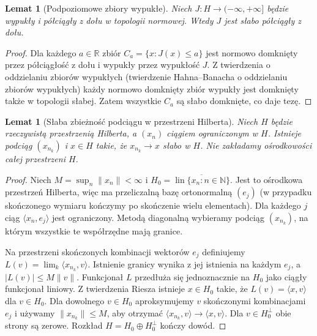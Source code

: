 \documentclass[11pt,a4paper]{article}
\numberwithin{equation}{section}
\theoremstyle{plain}
\newtheorem{lemat}[twierdzenie]{Lemat}
\theoremstyle{definition}
\theoremstyle{remark}
\newcommand{\R}{\mathbb R}
\newcommand{\N}{\mathbb N}
\begin{document}
\begin{lemat}[Podpoziomowe zbiory wypukłe]
\label{lem:convex-weaklsc16}
Niech $J:H\to(-\infty,+\infty]$ będzie wypukły
i półciągły z dołu w topologii normowej.
Wtedy $J$ jest słabo półciągły z dołu.
\end{lemat}
\begin{proof}
Dla każdego $a\in\R$ zbiór $C_a=\{x:J(x)\le a\}$
jest normowo domknięty przez półciągłość z dołu
i wypukły przez wypukłość $J$. Z twierdzenia
o oddzielaniu zbiorów wypukłych (twierdzenie Hahna--Banacha o oddzielaniu zbiorów wypukłych)
każdy normowo domknięty zbiór wypukły jest domknięty
także w topologii słabej. Zatem wszystkie $C_a$
są słabo domknięte, co daje tezę.
\end{proof}

\begin{lemat}[Słaba zbieżność podciągu w przestrzeni Hilberta]
\label{lem:hilbert-weakseq16}
Niech $H$ będzie rzeczywistą przestrzenią Hilberta,
a $(x_n)$ ciągiem ograniczonym w $H$.
Istnieje podciąg $(x_{n_k})$ i $x\in H$ takie,
że $x_{n_k}\to x$ słabo w $H$.
Nie zakładamy ośrodkowości całej przestrzeni $H$.
\end{lemat}
\begin{proof}
Niech $M=\sup_n\|x_n\|<\infty$ i
$H_0=\overline{\operatorname{lin}\{x_n:n\in\N\}}$.
Jest to ośrodkowa przestrzeń Hilberta, więc ma
przeliczalną bazę ortonormalną $(e_j)$
(w przypadku skończonego wymiaru kończymy po skończenie wielu elementach).
Dla każdego $j$ ciąg $\langle x_n,e_j\rangle$ jest ograniczony.
Metodą diagonalną wybieramy podciąg $(x_{n_k})$,
na którym wszystkie te współrzędne mają granice.

Na przestrzeni skończonych kombinacji wektorów $e_j$
definiujemy $L(v)=\lim_k\langle x_{n_k},v\rangle$.
Istnienie granicy wynika z jej istnienia na każdym $e_j$,
a $|L(v)|\le M\|v\|$. Funkcjonał $L$ przedłuża się
jednoznacznie na $H_0$ jako ciągły funkcjonał liniowy.
Z twierdzenia Riesza istnieje $x\in H_0$ takie,
że $L(v)=\langle x,v\rangle$ dla $v\in H_0$.
Dla dowolnego $v\in H_0$ aproksymujemy $v$
skończonymi kombinacjami $e_j$ i używamy
$\|x_{n_k}\|\le M$, aby otrzymać
$\langle x_{n_k},v\rangle\to\langle x,v\rangle$.
Dla $v\in H_0^\perp$ obie strony są zerowe.
Rozkład $H=H_0\oplus H_0^\perp$ kończy dowód.
\end{proof}
\end{document}
